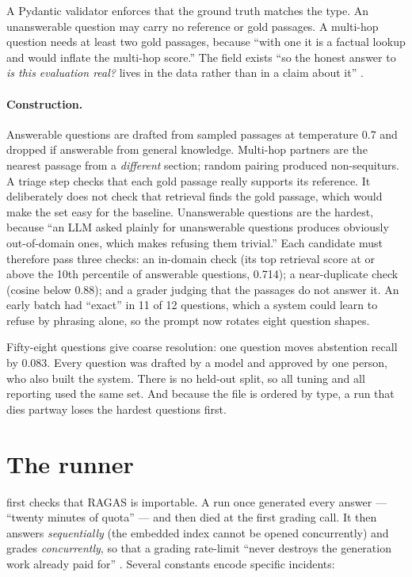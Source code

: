 A Pydantic validator enforces that the ground truth matches the type. An unanswerable question may carry no reference or gold passages. A multi-hop question needs at least two gold passages, because ``with one it is a factual lookup and would inflate the multi-hop score.'' The  field exists ``so the honest answer to \emph{is this evaluation real?} lives in the data rather than in a claim about it'' .

\paragraph{Construction.} Answerable questions are drafted from sampled passages at temperature 0.7 and dropped if answerable from general knowledge. Multi-hop partners are the nearest passage from a \emph{different} section; random pairing produced non-sequiturs. A triage step checks that each gold passage really supports its reference. It deliberately does not check that retrieval finds the gold passage, which would make the set easy for the baseline. Unanswerable questions are the hardest, because ``an LLM asked plainly for unanswerable questions produces obviously out-of-domain ones, which makes refusing them trivial.'' Each candidate must therefore pass three checks: an in-domain check (its top retrieval score at or above the 10th percentile of answerable questions, 0.714); a near-duplicate check (cosine below 0.88); and a grader judging that the passages do not answer it. An early batch had ``exact'' in 11 of 12 questions, which a system could learn to refuse by phrasing alone, so the prompt now rotates eight question shapes.

\begin{inferred}[limits]
Fifty-eight questions give coarse resolution: one question moves abstention recall by 0.083. Every question was drafted by a model and approved by one person, who also built the system. There is no held-out split, so all tuning and all reporting used the same set. And because the file is ordered by type, a run that dies partway loses the hardest questions first.
\end{inferred}

\section{The runner}
\label{sec:runner}

 first checks that RAGAS is importable. A run once generated every answer --- ``twenty minutes of quota'' --- and then died at the first grading call. It then answers \emph{sequentially} (the embedded index cannot be opened concurrently) and grades \emph{concurrently}, so that a grading rate-limit ``never destroys the generation work already paid for'' . Several constants encode specific incidents:

